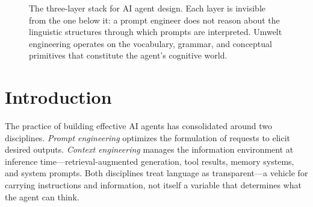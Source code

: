 \documentclass[11pt,a4paper]{article}
\begin{document}
\begin{figure}[t]
\centering
{}
\caption{The three-layer stack for AI agent design. Each layer is invisible from the one below it: a prompt engineer does not reason about the linguistic structures through which prompts are interpreted. Umwelt engineering operates on the vocabulary, grammar, and conceptual primitives that constitute the agent's cognitive world.}
\label{fig:stack}
\end{figure}

\section{Introduction}

The practice of building effective AI agents has consolidated around two disciplines. \emph{Prompt engineering} optimizes the formulation of requests to elicit desired outputs. \emph{Context engineering} manages the information environment at inference time---retrieval-augmented generation, tool results, memory systems, and system prompts. Both disciplines treat language as transparent---a vehicle for carrying instructions and information, not itself a variable that determines what the agent can think.
\end{document}
